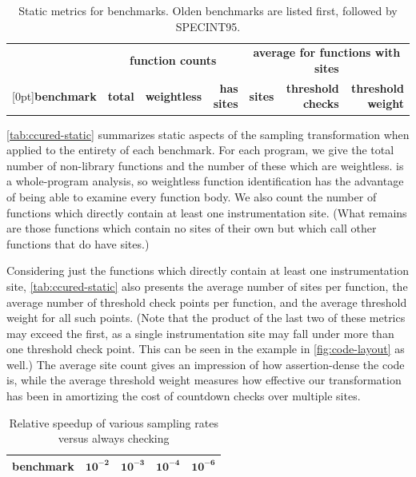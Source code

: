 \begin{table}[tb]
  \centering
  \begin{tabular}{|l|rrr|rrr|}
    \hline
    & \multicolumn{3}{c|}{\textbf{function counts}} & \multicolumn{3}{c|}{\textbf{average for functions with sites}} \\
    \raisebox{1.5ex}[0pt]{\textbf{benchmark}} & \textbf{total} & \textbf{weightless} & \textbf{has sites} & \textbf{sites} & \textbf{threshold checks} & \textbf{threshold weight} \\
    \hline\hline
    
    \hline
    
    \hline
  \end{tabular}
  \caption{Static metrics for \CCured benchmarks.  Olden benchmarks
    are listed first, followed by SPECINT95.}
  \label{tab:ccured-static}
\end{table}

\autoref{tab:ccured-static} summarizes static aspects of the sampling
transformation when applied to the entirety of each benchmark.  For
each program, we give the total number of non-library functions and
the number of these which are weightless.  \CCured is a whole-program
analysis, so weightless function identification has the advantage of
being able to examine every function body.  We also count the number
of functions which directly contain at least one instrumentation site.
(What remains are those functions which contain no sites of their own
but which call other functions that do have sites.)

Considering just the functions which directly contain at least one
instrumentation site, \autoref{tab:ccured-static} also presents the
average number of sites per function, the average number of threshold
check points per function, and the average threshold weight for all
such points.  (Note that the product of the last two of these metrics
may exceed the first, as a single instrumentation site may fall under
more than one threshold check point.  This can be seen in the example
in \autoref{fig:code-layout} as well.)  The average site count gives
an impression of how assertion-dense the code is, while the average
threshold weight measures how effective our transformation has been in
amortizing the cost of countdown checks over multiple sites.

\begin{table}
  \centering
  \begin{tabular}{|l|rrrr|}
    \hline
    \rule{0pt}{2.5ex}
    \textbf{benchmark} & $\mathbf{10^{-2}}$ & $\mathbf{10^{-3}}$ & $\mathbf{10^{-4}}$ & $\mathbf{10^{-6}}$ \\
    \hline\hline
    
    \hline
    
    \hline
  \end{tabular}
  \caption{Relative speedup of various sampling rates versus always checking}
  \label{tab:ccured-density}
\end{table}

